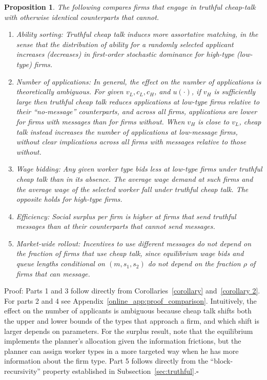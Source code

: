 \documentclass[12pt]{article}
\newtheorem{prop}{Proposition}
\begin{document}
\begin{prop}
\label{comparison1} The following compares firms that engage in truthful
cheap-talk with otherwise identical counterparts that cannot.

\begin{enumerate}
\item Ability sorting: Truthful cheap talk induces more assortative matching, in the sense that the distribution of ability for a randomly selected applicant increases (decreases) in first-order stochastic dominance for high-type (low-type) firms.

\item Number of applications: In general, the effect on the number of applications is theoretically ambiguous. For given $v_{L},c_{L},c_{H}$, and $u(\cdot)$, if $v_{H}$ is sufficiently large then truthful cheap talk reduces applications at low-type firms relative to their ``no-message'' counterparts, and across all firms, applications are lower for firms with messages than for firms without. When $v_{H}$ is close to $v_{L}$, cheap talk instead increases the number of applications at low-message firms, without clear implications across all firms with messages relative to those without.

\item Wage bidding: Any given worker type bids less at low-type firms under truthful cheap talk than in its absence. The average wage demand at such firms and the average wage of the selected worker fall under truthful cheap talk. The opposite holds for high-type firms.

\item Efficiency: Social surplus per firm is higher at firms that send truthful messages than at their counterparts that cannot send messages.

\item Market-wide rollout: Incentives to use different messages do not depend on the fraction of firms that use cheap talk, since equilibrium wage bids and queue lengths conditional on $(m,s_{1},s_{2})$ do not depend on the fraction $\rho$ of firms that can message.
\end{enumerate}
\end{prop}

\noindent Proof: Parts 1 and 3 follow directly from Corollaries~\ref{corollary} and~\ref{corollary 2}. For parts 2 and 4 see Appendix~\ref{online_app:proof_comparison}. Intuitively, the effect on the number of applicants is ambiguous because cheap talk shifts both the upper and lower bounds of the types that approach a firm, and which shift is larger depends on parameters. For the surplus result, note that the equilibrium implements the planner's allocation given the information frictions, but the planner can assign worker types in a more targeted way when he has more information about the firm type. Part 5 follows directly from the ``block-recursivity'' property established in Subsection~\ref{sec:truthful}.$\square$
\end{document}
